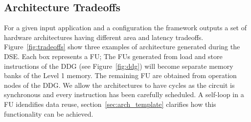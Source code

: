 \subsection{Architecture Tradeoffs}
For a given input application and a configuration the framework outputs a set of hardware architectures having different area and latency tradeoffs. Figure~\ref{fig:tradeoffs} show three examples of architecture generated during the DSE. Each box represents a FU; The FUs generated from load and store instructions of the DDG (see Figure~\ref{fig:ddg}) will become separate memory banks of the Level 1 memory. The remaining FU are obtained from operation nodes of the DDG. We allow the architectures to have cycles as the circuit is synchronous and every instruction has been carefully scheduled. A self-loop in a FU idendifies data reuse, section~\ref{sec:arch_template} clarifies how this functionality can be achieved.

